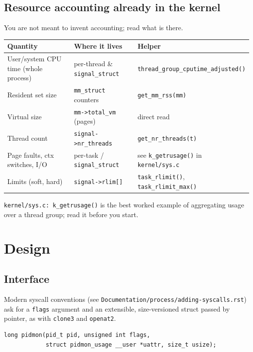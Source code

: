 \documentclass[11pt,a4paper]{article}
\newcommand{\kfile}[1]{\texttt{\small #1}}
\begin{document}
\subsection{Resource accounting already in the kernel}
You are not meant to invent accounting; read what is there.
\begin{center}\small
\begin{tabular}{@{}lll@{}}
\toprule
Quantity & Where it lives & Helper \\
\midrule
User/system CPU time (whole process) & per-thread \& \texttt{signal\_struct} & \texttt{thread\_group\_cputime\_adjusted()} \\
Resident set size & \texttt{mm\_struct} counters & \texttt{get\_mm\_rss(mm)} \\
Virtual size & \texttt{mm->total\_vm} (pages) & direct read \\
Thread count & \texttt{signal->nr\_threads} & \texttt{get\_nr\_threads(t)} \\
Page faults, ctx switches, I/O & per-task / \texttt{signal\_struct} & see \texttt{k\_getrusage()} in \kfile{kernel/sys.c} \\
Limits (soft, hard) & \texttt{signal->rlim[]} & \texttt{task\_rlimit()}, \texttt{task\_rlimit\_max()} \\
\bottomrule
\end{tabular}
\end{center}
\kfile{kernel/sys.c: k\_getrusage()} is the best worked example of aggregating usage over a thread group; read it before you start.

\section{Design}\label{sec:design}
\subsection{Interface}
Modern syscall conventions (see \kfile{Documentation/process/adding-syscalls.rst}) ask for a \texttt{flags} argument and an extensible, size-versioned struct passed by pointer, as with \texttt{clone3} and \texttt{openat2}.

\begin{lstlisting}
long pidmon(pid_t pid, unsigned int flags,
            struct pidmon_usage __user *uattr, size_t usize);
\end{lstlisting}
\end{document}

